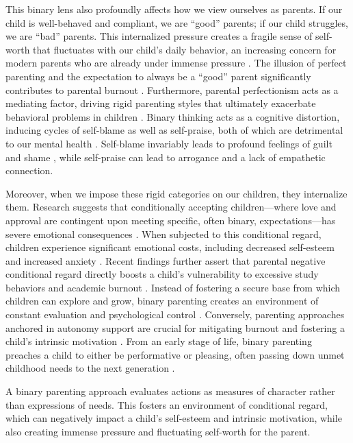 This binary lens also profoundly affects how we view ourselves as parents.
If our child is well-behaved and compliant, we are ``good'' parents; if our child struggles, we are ``bad'' parents.
This internalized pressure creates a fragile sense of self-worth that fluctuates with our child's daily behavior, an increasing concern for modern parents who are already under immense pressure \citep{murthy2024}.
The illusion of perfect parenting and the expectation to always be a ``good'' parent significantly contributes to parental burnout \citep{gawlik2024}.
Furthermore, parental perfectionism acts as a mediating factor, driving rigid parenting styles that ultimately exacerbate behavioral problems in children \citep{ince2025}.
Binary thinking acts as a cognitive distortion, inducing cycles of self-blame as well as self-praise, both of which are detrimental to our mental health \citep{yildiz2023}.
Self-blame invariably leads to profound feelings of guilt and shame \citep{brown2012}, while self-praise can lead to arrogance and a lack of empathetic connection.

Moreover, when we impose these rigid categories on our children, they internalize them.
Research suggests that conditionally accepting children---where love and approval are contingent upon meeting specific, often binary, expectations---has severe emotional consequences \citep{kohn2005}.
When subjected to this conditional regard, children experience significant emotional costs, including decreased self-esteem and increased anxiety \citep{assor2004}.
Recent findings further assert that parental negative conditional regard directly boosts a child's vulnerability to excessive study behaviors and academic burnout \citep{brueckmann2025}.
Instead of fostering a secure base from which children can explore and grow, binary parenting creates an environment of constant evaluation and psychological control \citep{soenens2010}.
Conversely, parenting approaches anchored in autonomy support are crucial for mitigating burnout and fostering a child's intrinsic motivation \citep{wang2026}.
From an early stage of life, binary parenting preaches a child to either be performative or pleasing, often passing down unmet childhood needs to the next generation \citep{kaya2025}.

\begin{keyinsight}
A binary parenting approach evaluates actions as measures of character rather than expressions of needs.
This fosters an environment of conditional regard, which can negatively impact a child's self-esteem and intrinsic motivation, while also creating immense pressure and fluctuating self-worth for the parent.
\end{keyinsight}

